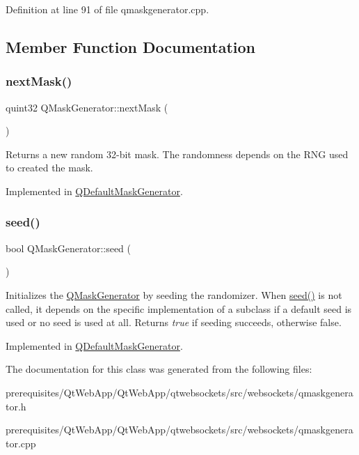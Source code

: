 Definition at line 91 of file qmaskgenerator.\+cpp.



\subsection{Member Function Documentation}
\mbox{\label{class_q_mask_generator_aff3309c2b67cfd4ae6e0cba615e9d4dd}} 
\subsubsection{\texorpdfstring{next\+Mask()}{nextMask()}}
{\footnotesize\ttfamily quint32 Q\+Mask\+Generator\+::next\+Mask (\begin{DoxyParamCaption}{ }\end{DoxyParamCaption})\hspace{0.3cm}{\ttfamily [pure virtual]}}

Returns a new random 32-\/bit mask. The randomness depends on the R\+NG used to created the mask. 

Implemented in \mbox{\hyperlink{class_q_default_mask_generator_a1dde10b93e9e5c484cf15cfced080226}{Q\+Default\+Mask\+Generator}}.

\mbox{\label{class_q_mask_generator_a4e311595fc7cd457bd5c50293cdb7916}} 
\subsubsection{\texorpdfstring{seed()}{seed()}}
{\footnotesize\ttfamily bool Q\+Mask\+Generator\+::seed (\begin{DoxyParamCaption}{ }\end{DoxyParamCaption})\hspace{0.3cm}{\ttfamily [pure virtual]}}

Initializes the \mbox{\hyperlink{class_q_mask_generator}{Q\+Mask\+Generator}} by seeding the randomizer. When \mbox{\hyperlink{class_q_mask_generator_a4e311595fc7cd457bd5c50293cdb7916}{seed()}} is not called, it depends on the specific implementation of a subclass if a default seed is used or no seed is used at all. Returns {\itshape true} if seeding succeeds, otherwise false. 

Implemented in \mbox{\hyperlink{class_q_default_mask_generator_a0ee0187ffa93deb9e30d96f4c560a48d}{Q\+Default\+Mask\+Generator}}.



The documentation for this class was generated from the following files\+:\begin{DoxyCompactItemize}
\item 
prerequisites/\+Qt\+Web\+App/\+Qt\+Web\+App/qtwebsockets/src/websockets/qmaskgenerator.\+h\item 
prerequisites/\+Qt\+Web\+App/\+Qt\+Web\+App/qtwebsockets/src/websockets/qmaskgenerator.\+cpp\end{DoxyCompactItemize}

